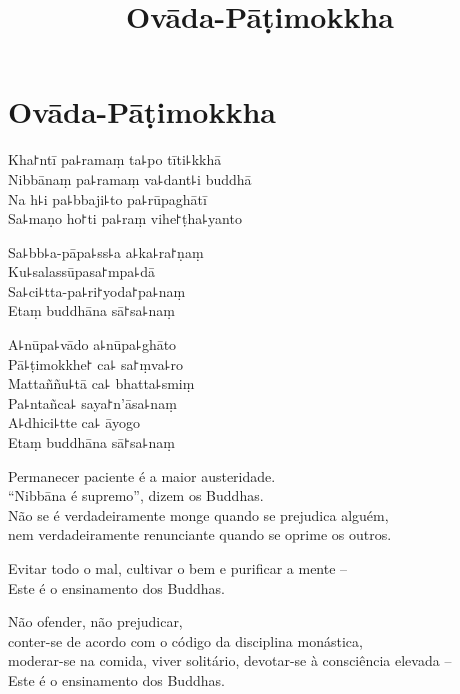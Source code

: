\documentclass[
  babelLanguage=portuguese,
  final,
]{chantingbook}
\title{Ovāda-Pāṭimokkha}
\begin{document}
\mainmatter

\eveningChapterSettings

\chapter{Ovāda-Pāṭimokkha}

\thispagestyle{empty}

\enlargethispage{2\baselineskip}

\begin{leader}
\end{leader}

Kha꜓ntī pa꜕ramaṃ ta꜕po tīti꜕kkhā\\
Nibbānaṃ pa꜕ramaṃ va꜕dant꜕i buddhā\\
Na h꜕i pa꜕bbaji꜕to pa꜕rūpaghātī\\
Sa꜕maṇo ho꜓ti pa꜕raṃ vihe꜓ṭha꜕yanto

Sa꜕bb꜕a-pāpa꜕ss꜕a a꜕ka꜕ra꜓ṇaṃ\\
Ku꜕salassūpasa꜓mpa꜕dā\\
Sa꜕ci꜕tta-pa꜕ri꜓yoda꜓pa꜕naṃ\\
Etaṃ buddhāna sā꜓sa꜕naṃ

A꜕nūpa꜕vādo a꜕nūpa꜕ghāto\\
Pā꜕ṭimokkhe꜓ ca꜕ sa꜓ṃva꜕ro\\
Mattaññu꜕tā ca꜕ bhatta꜕smiṃ\\
Pa꜕ntañca꜕ saya꜓n'āsa꜕naṃ\\
A꜕dhici꜕tte ca꜕ āyogo\\
Etaṃ buddhāna sā꜓sa꜕naṃ

\bigskip

{\itshape

Permanecer paciente é a maior austeridade.\\
“Nibbāna é supremo”, dizem os Buddhas.\\
Não se é verdadeiramente monge quando se prejudica alguém,\\
nem verdadeiramente renunciante quando se oprime os outros.

Evitar todo o mal, cultivar o bem e purificar a mente --\\
Este é o ensinamento dos Buddhas.

Não ofender, não prejudicar,\\
conter-se de acordo com o código da disciplina monástica,\\
moderar-se na comida, viver solitário, devotar-se à consciência elevada --\\
Este é o ensinamento dos Buddhas.

}
\end{document}
